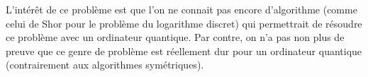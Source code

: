 \documentclass[a4paper, 12pt]{article}
\begin{document}
L'intérêt de ce problème est que l'on ne connait pas encore d'algorithme (comme celui de Shor pour le problème du logarithme discret) qui permettrait de résoudre ce problème avec un ordinateur quantique. Par contre, on n'a pas non plus de preuve que ce genre de problème est réellement dur pour un ordinateur quantique (contrairement aux algorithmes symétriques). 





\end{document}
